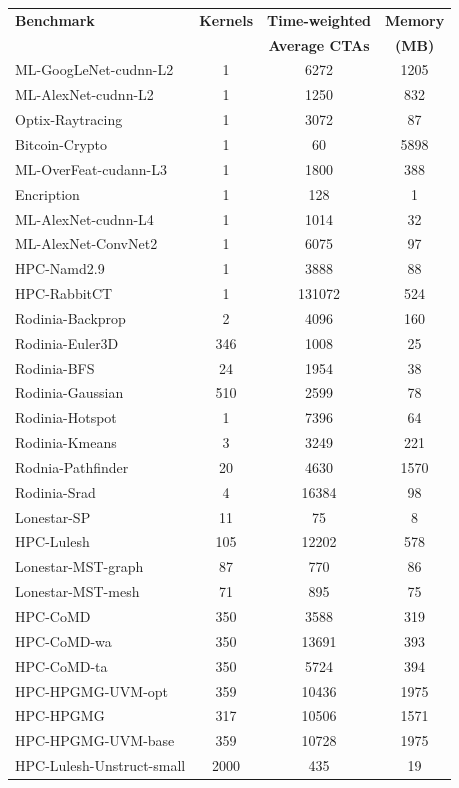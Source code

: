 \begin{table}[t]
\begin{small}
\centering
\begin{tabular}{lccc}
 \toprule
 \textbf{Benchmark} & \textbf{Kernels} & \textbf{Time-weighted} & \textbf{Memory} \\
& & \textbf{Average CTAs} & \textbf{(MB)} \\
 \toprule
ML-GoogLeNet-cudnn-L2 & 1 & 6272 & 1205 \\
ML-AlexNet-cudnn-L2 & 1 & 1250 & 832 \\
Optix-Raytracing & 1 & 3072 & 87 \\
Bitcoin-Crypto & 1 & 60 & 5898 \\
ML-OverFeat-cudann-L3 & 1 & 1800 & 388 \\
Encription & 1 & 128 & 1 \\
ML-AlexNet-cudnn-L4 & 1 & 1014 & 32 \\
ML-AlexNet-ConvNet2 & 1 & 6075 & 97 \\
HPC-Namd2.9 & 1 & 3888 & 88 \\
HPC-RabbitCT & 1 & 131072 & 524 \\
Rodinia-Backprop & 2 & 4096 & 160 \\
Rodinia-Euler3D & 346 & 1008 & 25 \\
Rodinia-BFS & 24 & 1954 & 38 \\
Rodinia-Gaussian & 510 & 2599 & 78 \\
Rodinia-Hotspot & 1 & 7396 & 64 \\
Rodinia-Kmeans & 3 & 3249 & 221 \\
Rodnia-Pathfinder & 20 & 4630 & 1570 \\
Rodinia-Srad & 4 & 16384 & 98 \\
Lonestar-SP & 11 & 75 & 8 \\
HPC-Lulesh & 105 & 12202 & 578 \\
Lonestar-MST-graph & 87 & 770 & 86 \\
Lonestar-MST-mesh & 71 & 895 & 75 \\
HPC-CoMD & 350 & 3588 & 319 \\
HPC-CoMD-wa & 350 & 13691 & 393 \\
HPC-CoMD-ta & 350 & 5724 & 394 \\
HPC-HPGMG-UVM-opt & 359 & 10436 & 1975 \\
HPC-HPGMG & 317 & 10506 & 1571 \\
HPC-HPGMG-UVM-base & 359 & 10728 & 1975 \\
HPC-Lulesh-Unstruct-small & 2000 & 435 & 19 \\

\end{tabular}
\end{small}
\end{table}
